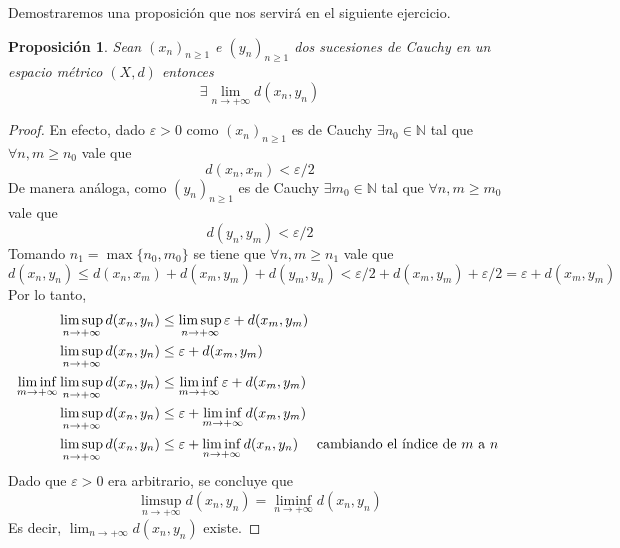 \documentclass{article}
\theoremstyle{plain}
\newtheorem{proposicion}{Proposición}[section]
\theoremstyle{definition}
\newcommand{\N}{\mathbb{N}}
\begin{document}
Demostraremos una proposición que nos servirá en el siguiente ejercicio.
\begin{proposicion}
    Sean \( {(x_n)}_{n \geq 1} \) e \( {(y_n)}_{n \geq 1} \) dos sucesiones de Cauchy en un espacio métrico \( (X, d) \) entonces \[ \exists \lim_{n \to +\infty} d(x_n, y_n) \]
\end{proposicion}
\begin{proof}
    En efecto, dado \( \varepsilon > 0 \) como \( {(x_n)}_{n \geq 1} \) es de Cauchy \( \exists n_0 \in \N \) tal que \( \forall n, m \geq n_0 \) vale que \[
        d(x_n, x_m) < \varepsilon/2
    \]
    De manera análoga, como \( {(y_n)}_{n \geq 1} \) es de Cauchy \( \exists m_0 \in \N \) tal que \( \forall n, m \geq m_0 \) vale que \[
        d(y_n, y_m) < \varepsilon/2
    \]
    Tomando \( n_1 = \max \{ n_0, m_0 \} \) se tiene que \( \forall n, m \geq n_1 \) vale que \[
        d(x_n, y_n) \leq d(x_n, x_m) + d(x_m, y_m) + d(y_m, y_n) < \varepsilon/2 + d(x_m, y_m) + \varepsilon/2 = \varepsilon + d(x_m, y_m)
    \]
    Por lo tanto, \begin{align*}
        \limsup_{n \to +\infty} d(x_n, y_n)                         & \leq \limsup_{n \to +\infty} \varepsilon + d(x_m, y_m)                                                         \\
        \limsup_{n \to +\infty} d(x_n, y_n)                         & \leq \varepsilon + d(x_m, y_m)                                                                                 \\
        \liminf_{m \to +\infty} \limsup_{n \to +\infty} d(x_n, y_n) & \leq \liminf_{m \to +\infty} \varepsilon + d(x_m, y_m)                                                         \\
        \limsup_{n \to +\infty} d(x_n, y_n)                         & \leq \varepsilon + \liminf_{m \to +\infty} d(x_m, y_m)                                                         \\
        \limsup_{n \to +\infty} d(x_n, y_n)                         & \leq \varepsilon + \liminf_{n \to +\infty} d(x_n, y_n) \quad \text{ cambiando el índice de \( m \) a \( n \) }
    \end{align*}
    Dado que \( \varepsilon > 0 \) era arbitrario,
    se concluye que \[ \limsup_{n \to +\infty} d(x_n, y_n) = \liminf_{n \to +\infty} d(x_n, y_n) \]
    Es decir, \( \lim_{n \to +\infty} d(x_n, y_n) \) existe.
\end{proof}
\end{document}

